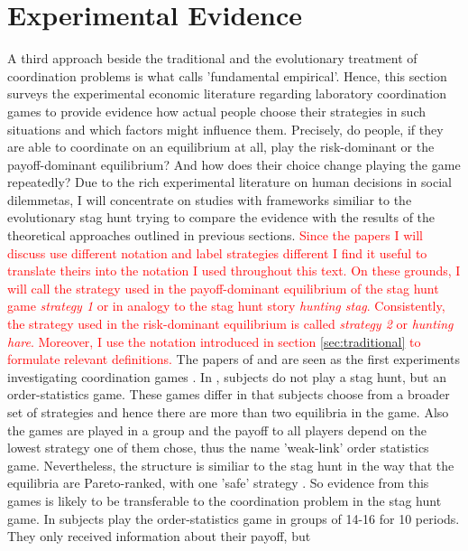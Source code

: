 \documentclass[12pt]{article}
\begin{document}
\section{Experimental Evidence}
A third approach beside the traditional and the evolutionary treatment of coordination problems is what \cite{camerer} calls 'fundamental empirical'.
Hence, this section surveys the experimental economic literature regarding 
laboratory coordination games to provide evidence how actual people choose
their strategies in such situations and which factors might influence them. 
Precisely, do people, if they are able to coordinate on an equilibrium at all,
play the risk-dominant or the payoff-dominant equilibrium? And how does their
choice change playing the game repeatedly?
Due to the rich experimental literature on human decisions in social dilemmetas, I will concentrate on studies with frameworks similiar to the evolutionary stag hunt trying to compare the evidence with the results of the theoretical approaches outlined in previous sections. 
\textcolor{red}{Since the papers I will discuss use different notation and 
label strategies different I find it useful to translate theirs into the
notation I used throughout this text. On these grounds, I will call the 
strategy used in the payoff-dominant equilibrium of the stag hunt game
\textit{strategy 1} or in analogy to the stag hunt story \textit{hunting stag}.
Consistently, the strategy used in the risk-dominant equilibrium is called
\textit{strategy 2} or \textit{hunting hare}. Moreover, I use the notation
introduced in section \ref{sec:traditional} to formulate relevant definitions.}
The papers of \textcite{van_huyck_tacit_1990} and \textcite{cooper_communication_1992} are 
seen as the first experiments investigating coordination games \parencite{devetag_when_2007}.
In \textcite{van_huyck_tacit_1990}, subjects do not play a stag
hunt, but an order-statistics game. These games differ in that subjects choose
from a broader set of strategies and hence there are more than two equilibria
in the game. Also the games are played in a group and the payoff to all 
players depend on the lowest strategy one of them chose, thus the name 
'weak-link' order statistics game. Nevertheless, the structure is similiar to 
the stag hunt in the way that the equilibria are Pareto-ranked, with one 
'safe' strategy \parencite{devetag_when_2007}. So evidence from this games is likely to 
be transferable to the coordination problem in the stag hunt game. In 
\cite{van_huyck_tacit_1990} subjects play the order-statistics game in groups of 
14-16 for 10 periods. They only received information about their payoff, but 
\end{document}
